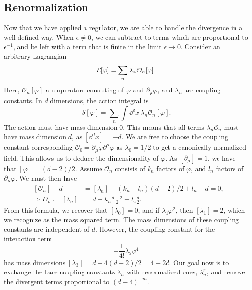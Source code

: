 \subsection*{Renormalization}

Now that we have applied a regulator, we are able to handle the divergence in a well-defined way.
When $\epsilon \neq 0$, we can subtract to terms which are proportional to $\epsilon^{-1}$, and be left with a term that is finite in the limit $\epsilon \rightarrow 0$.
Consider an arbitrary Lagrangian, 
\begin{equation}
    \mathcal{L}[\varphi] = \sum_n \lambda_n \mathcal{O}_n[\varphi].
\end{equation}
Here, $\mathcal{O}_n[\varphi]$ are operators consisting of $\varphi$ and $\partial_\mu \varphi$, and $\lambda_n$ are coupling constants.
In $d$ dimensions, the action integral is
\begin{equation}
    S[\varphi] = \sum_n \int \dd^d x \, \lambda_n \mathcal{O}_n[\varphi].
\end{equation}
The action must have mass dimension $0$.
This means that all terms $\lambda_n \mathcal O_n$ must have mass dimension $d$, as $[\dd^d x] = -d$.
We are free to choose the coupling constant corresponding $\mathcal O_0 = \partial_\mu \varphi \partial^\mu \varphi$ as $\lambda_0 = 1/2$ to get a canonically normalized field.
This allows us to deduce the dimensionality of $\varphi$.
As $[\partial_\mu] = 1$, we have that $[\varphi] = (d-2)/2$.
Assume $\mathcal O_n$ consists of $k_n$ factors of $\varphi$, and $l_n$ factors of $\partial_\mu \varphi$.
We must then have
\begin{align}
    [\lambda_n] + [\mathcal{O}_n] - d &= [\lambda_n] + (k_n + l_n)(d - 2) / 2 + l_n - d = 0, \\
    \implies D_n := [\lambda_n] &= d - k_n \frac{d - 2}{2} - l_n \frac{d}{2}.
\end{align}
From this formula, we recover that $[\lambda_0] = 0$, and if $\lambda_1 \varphi^2$, then $[\lambda_1] = 2$, which we recognize as the mass squared term.
The mass dimensions of these coupling constants are independent of $d$.
However, the coupling constant for the interaction term
\begin{equation}
    - \frac{1}{4!} \lambda_3 \varphi^4
\end{equation}
has mass dimensions $[\lambda_3] = d -4(d-2)/2 = 4 - 2d$.
Our goal now is to exchange the bare coupling constants $\lambda_n$ with renormalized ones, $\lambda_n^r$, and remove the divergent terms proportional to $(d - 4)^{-m}$.
